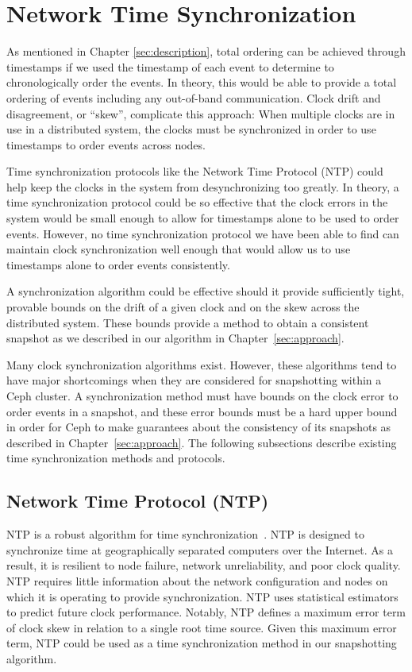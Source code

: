 \section{Network Time Synchronization}

As mentioned in Chapter \ref{sec:description}, total ordering can be
achieved through timestamps if we used the timestamp of each event to 
determine to chronologically order the events. 
In theory, this would be able to provide
a total ordering of events including any out-of-band
communication. Clock drift and disagreement, or ``skew'', complicate this approach: When
multiple clocks are in use in a distributed system, the clocks must be
synchronized in order to use timestamps to order events across nodes.

Time synchronization protocols like the Network Time Protocol (NTP)
could help keep the clocks in the system from desynchronizing too
greatly. In theory, a time synchronization protocol could be so effective that 
the clock errors in the system would be small enough to allow for timestamps 
alone to be used to order events. However, no time synchronization protocol 
we have been able to
find can maintain clock synchronization well enough that would allow
us to use timestamps alone to order events consistently. 

A synchronization algorithm could be effective should it provide
sufficiently tight, provable bounds on the drift of a given clock and
on the skew across the distributed system. These bounds provide a
method to obtain a consistent snapshot as we described in our
algorithm in Chapter~\ref{sec:approach}.

Many clock synchronization algorithms exist. However, these
algorithms tend to have major shortcomings when they are considered
for snapshotting within a Ceph cluster. A
synchronization method must have bounds on the clock error to order
events in a snapshot, and these error bounds must be a hard upper
bound in order for Ceph to make guarantees about the consistency of
its snapshots as described in Chapter~\ref{sec:approach}. The following subsections describe existing time
synchronization methods and protocols.

\subsection{Network Time Protocol (NTP)}

NTP is a robust algorithm for time
synchronization~\citep{Burbank2010}. NTP is designed to synchronize
time at geographically separated computers over the Internet. As a
result, it is resilient to node failure, network unreliability, and
poor clock quality. NTP requires little information about the
network configuration and nodes on which it is operating to provide 
synchronization. NTP uses statistical estimators to predict
future clock performance. Notably, NTP defines a maximum error
term of clock skew in relation to a single root time source. Given this maximum
error term, NTP could be used as a time synchronization method
in our snapshotting algorithm.

